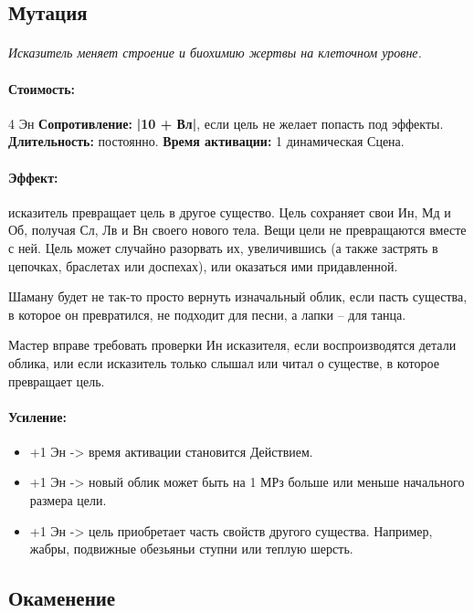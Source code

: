 \subsection{Мутация}
\paragraph{} 
\textit{Исказитель меняет строение и биохимию жертвы на клеточном уровне.}
\paragraph{Стоимость: }4 Эн
\newline
\textbf{Сопротивление: }
\textbf{|10 + Вл|}, если цель не желает попасть под эффекты.
\newline 
\textbf{Длительность: }постоянно.
\newline 
\textbf{Время активации: }1 динамическая Сцена.
\paragraph{Эффект: }исказитель превращает цель в другое существо. Цель сохраняет свои Ин, Мд и Об, получая Сл, Лв и Вн своего нового тела. Вещи цели не превращаются вместе с ней. Цель может случайно разорвать их, увеличившись (а также застрять в цепочках, браслетах или доспехах), или оказаться ими придавленной. 
\begin{tcolorbox} Шаману будет не так-то просто вернуть изначальный облик, если пасть существа, в которое он превратился, не подходит для песни, а лапки – для танца. 
\end{tcolorbox} Мастер вправе требовать проверки Ин исказителя, если воспроизводятся детали облика, или если исказитель только слышал или читал о существе, в которое превращает цель.
\paragraph{Усиление:}
\begin{itemize}
\item+1 Эн -> время активации становится Действием.
\item+1 Эн -> новый облик может быть на 1 МРз больше или меньше начального размера цели.
\item+1 Эн -> цель приобретает часть свойств другого существа. Например, жабры, подвижные обезьяньи ступни или теплую шерсть.
\end{itemize}
\subsection{Окаменение}
